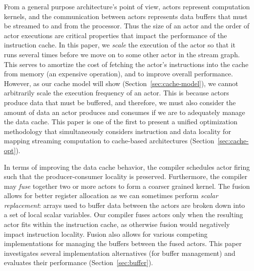 From a general purpose architecture's point of view, actors represent
computation kernels, and the communication between actors represents
data buffers that must be streamed to and from the processor. Thus
the size of an actor and the
order of actor executions are critical properties that
impact the performance of the instruction cache.  In this paper, we {\it scale}
the execution of the actor so that it runs several times before we move
on to some other actor in the stream 
graph. This serves to amortize the cost of fetching the actor's
instructions into the cache from memory (an expensive operation), and to
improve overall performance. However, as our cache model will show
(Section~\ref{sec:cache-model}), we 
cannot arbitrarily scale the execution frequency of an actor. This
is because actors produce data that must be buffered, and therefore,
we must also consider the amount of data an actor produces and
consumes if we are to adequately manage the data cache. 
This paper is one of the first to present a unified optimization methodology
that simultaneously considers instruction and data locality for
mapping streaming computation to cache-based architectures (Section~\ref{sec:cache-opt}).

In terms of improving the data cache behavior, the compiler schedules
actor firing such that the producer-consumer locality is
preserved. Furthermore,  the compiler may {\it fuse}
together two or more actors to form a coarser grained kernel.
The fusion allows for better register allocation as we can sometimes
perform {\it scalar replacement}: arrays used to buffer data between 
the actors are broken down into a set of local scalar variables.
Our compiler fuses
actors only when the resulting actor fits within the instruction cache, 
as otherwise fusion would negatively impact instruction locality.
Fusion also allows for
various competing implementations for managing the buffers between the
fused actors.  This paper investigates several implementation
alternatives (for buffer management) and evaluates their performance
(Section~\ref{sec:buffer}).


